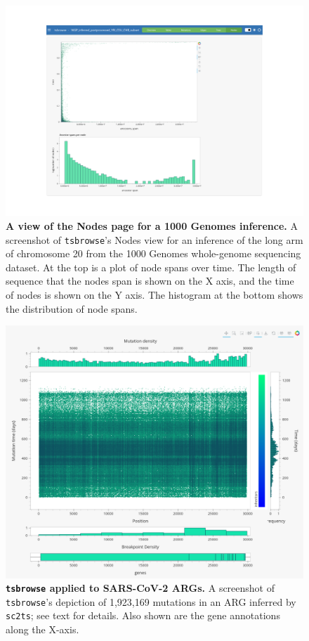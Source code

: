 \documentclass[unnumsec,webpdf,contemporary,large,namedate]{oup-authoring-template}%
\begin{document}
\begin{figure}
    \centering
    \includegraphics[width=0.95\linewidth]{figures/SuppFig3.png}
    \caption{\textbf{A view of the Nodes page for a 1000 Genomes inference.} A
        screenshot of \texttt{tsbrowse}'s Nodes view for an inference of the long arm
        of chromosome 20 from the 1000 Genomes whole-genome sequencing dataset. At the
        top is a plot of node spans over time. The length of sequence that the nodes
        span is shown on the X axis, and the time of nodes is shown on the Y axis. The
        histogram at the bottom shows the distribution of node spans. }
    \label{fig:Supplementary_Figure_3}
\end{figure}

\begin{figure}
    \centering
    \includegraphics[width=0.95\linewidth]{figures/SuppFig4.png}
    \caption{\textbf{\texttt{tsbrowse} applied to SARS-CoV-2 ARGs.}
        A screenshot of \texttt{tsbrowse}'s depiction of
        1,923,169 mutations in an
        ARG inferred by \texttt{sc2ts}; see  text for details. Also shown are the
        gene annotations along the X-axis.}
    \label{fig:Supplementary_Figure_4}
\end{figure}
\end{document}
